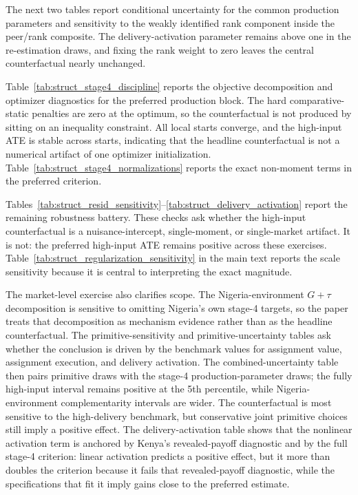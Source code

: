 \documentclass[11pt]{article}
\begin{document}


The next two tables report conditional uncertainty for the common production parameters and sensitivity to the weakly identified rank component inside the peer/rank composite. The delivery-activation parameter remains above one in the re-estimation draws, and fixing the rank weight to zero leaves the central counterfactual nearly unchanged.





Table~\ref{tab:struct_stage4_discipline} reports the objective decomposition and optimizer diagnostics for the preferred production block. The hard comparative-static penalties are zero at the optimum, so the counterfactual is not produced by sitting on an inequality constraint. All local starts converge, and the high-input ATE is stable across starts, indicating that the headline counterfactual is not a numerical artifact of one optimizer initialization. Table~\ref{tab:struct_stage4_normalizations} reports the exact non-moment terms in the preferred criterion.





Tables~\ref{tab:struct_resid_sensitivity}--\ref{tab:struct_delivery_activation} report the remaining robustness battery. These checks ask whether the high-input counterfactual is a nuisance-intercept, single-moment, or single-market artifact. It is not: the preferred high-input ATE remains positive across these exercises. Table~\ref{tab:struct_regularization_sensitivity} in the main text reports the scale sensitivity because it is central to interpreting the exact magnitude.

The market-level exercise also clarifies scope. The Nigeria-environment $G+\tau$ decomposition is sensitive to omitting Nigeria's own stage-4 targets, so the paper treats that decomposition as mechanism evidence rather than as the headline counterfactual. The primitive-sensitivity and primitive-uncertainty tables ask whether the conclusion is driven by the benchmark values for assignment value, assignment execution, and delivery activation. The combined-uncertainty table then pairs primitive draws with the stage-4 production-parameter draws; the fully high-input interval remains positive at the 5th percentile, while Nigeria-environment complementarity intervals are wider. The counterfactual is most sensitive to the high-delivery benchmark, but conservative joint primitive choices still imply a positive effect. The delivery-activation table shows that the nonlinear activation term is anchored by Kenya's revealed-payoff diagnostic and by the full stage-4 criterion: linear activation predicts a positive effect, but it more than doubles the criterion because it fails that revealed-payoff diagnostic, while the specifications that fit it imply gains close to the preferred estimate.
\end{document}
